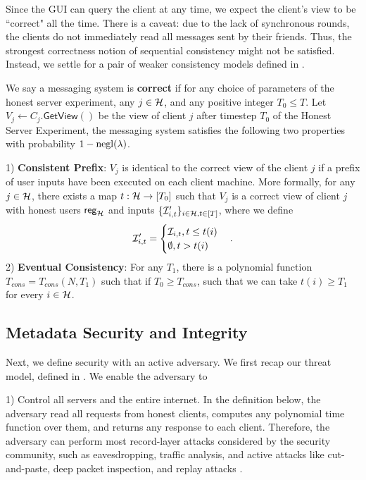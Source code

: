 Since the GUI can query the client at any time, we expect the client's view to be ``correct" all the time. There is a caveat: due to the lack of synchronous rounds, the clients do not immediately read all messages sent by their friends. Thus, the strongest correctness notion of sequential consistency might not be satisfied. Instead, we settle for a pair of weaker consistency models defined in \cite{doug13Consistency}. 
\begin{definition}
\label{defn:messaging-correctness}
 We say a messaging system is \textbf{correct} if for any choice of parameters of the honest server experiment, any $j \in \mathcal{H}$, and any positive integer $T_0 \leq T$. Let $V_j \leftarrow C_j.\mathsf{GetView}()$ be the view of client $j$ after timestep $T_0$ of the Honest Server Experiment, the messaging system satisfies the following two properties with probability $1 - \operatorname{negl}(\lambda)$.

1) \textbf{Consistent Prefix}: $V_j$ is identical to the correct view of the client $j$ if a prefix of user inputs have been executed on each client machine. More formally, for any $j \in \mathcal{H}$, there exists a map $t: \mathcal{H} \to [T_0]$ such that $V_j$ is a correct view of client $j$ with honest users $\mathsf{reg}_{\mathcal{H}}$ and inputs $\{\mathcal{I}'_{i, t}\}_{i \in \mathcal{H}, t \in [T]}$, where we define
$$\mathcal{I}'_{i, t} = \begin{cases}
\mathcal{I}_{i, t}, t \leq t(i) \\
\emptyset, t > t(i)
\end{cases}.$$
2) \textbf{Eventual Consistency}: For any $T_1$, there is a polynomial function $T_{cons} = T_{cons}(N, T_1)$ such that if $T_0 \geq T_{cons}$, such that we can take $t(i) \geq T_1$ for every $i \in \mathcal{H}$.
\end{definition}

\subsection{Metadata Security and Integrity}
\label{subsec:messaging-security-integrity}
Next, we define security with an active adversary. We first recap our threat model, defined in \cite[Section 2.2]{whitepaper}. We enable the adversary to

1) Control all servers and the entire internet. In the definition below, the adversary read all requests from honest clients, computes any polynomial time function over them, and returns any response to each client. Therefore, the adversary can perform most record-layer attacks considered by the security community, such as eavesdropping, traffic analysis, and active attacks like cut-and-paste, deep packet inspection, and replay attacks \cite{DB1996sslsecurity}.

